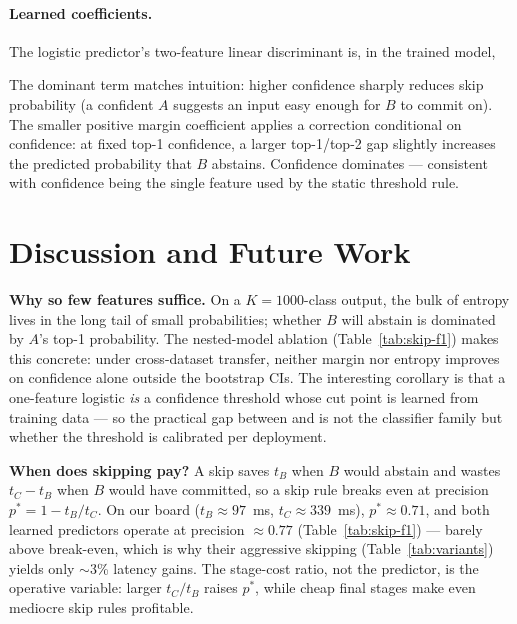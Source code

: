 \documentclass[conference]{IEEEtran}
\begin{document}
\paragraph{Learned coefficients.} The logistic predictor's two-feature linear discriminant is, in the trained model,

The dominant term matches intuition: higher confidence sharply reduces skip probability (a confident $A$ suggests an input easy enough for $B$ to commit on). The smaller positive margin coefficient applies a correction conditional on confidence: at fixed top-1 confidence, a larger top-1/top-2 gap slightly increases the predicted probability that $B$ abstains. Confidence dominates --- consistent with confidence being the single feature used by the static threshold rule.

\section{Discussion and Future Work}
\label{sec:discussion}

\textbf{Why so few features suffice.} On a $K{=}1000$-class output, the bulk of entropy lives in the long tail of small probabilities; whether $B$ will abstain is dominated by $A$'s top-1 probability. The nested-model ablation (Table~\ref{tab:skip-f1}) makes this concrete: under cross-dataset transfer, neither margin nor entropy improves on confidence alone outside the bootstrap CIs. The interesting corollary is that a one-feature logistic \emph{is} a confidence threshold whose cut point is learned from training data --- so the practical gap between \cite{nguyen2024probabilistic} and \cite{katikaneni2025randomforest} is not the classifier family but whether the threshold is calibrated per deployment.

\textbf{When does skipping pay?} A skip saves $t_B$ when $B$ would abstain and wastes $t_C - t_B$ when $B$ would have committed, so a skip rule breaks even at precision $p^\ast = 1 - t_B/t_C$. On our board ($t_B \approx 97$~ms, $t_C \approx 339$~ms), $p^\ast \approx 0.71$, and both learned predictors operate at precision $\approx 0.77$ (Table~\ref{tab:skip-f1}) --- barely above break-even, which is why their aggressive skipping (Table~\ref{tab:variants}) yields only $\sim$3\% latency gains. The stage-cost ratio, not the predictor, is the operative variable: larger $t_C/t_B$ raises $p^\ast$, while cheap final stages make even mediocre skip rules profitable.
\end{document}
